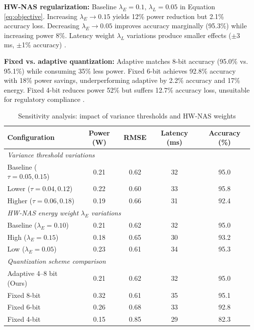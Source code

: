 \documentclass[12pt,a4paper]{article}
\begin{document}
\textbf{HW-NAS regularization:} Baseline $\lambda_E=0.1$, $\lambda_L=0.05$ in Equation \ref{eq:objective}. Increasing $\lambda_E \to 0.15$ yields 12\% power reduction but 2.1\% accuracy loss. Decreasing $\lambda_E \to 0.05$ improves accuracy marginally (95.3\%) while increasing power 8\%. Latency weight $\lambda_L$ variations produce smaller effects ($\pm$3 ms, $\pm$1\% accuracy) \citep{chitty2022hwnas, singh2024smart}.

\textbf{Fixed vs. adaptive quantization:} Adaptive matches 8-bit accuracy (95.0\% vs. 95.1\%) while consuming 35\% less power. Fixed 6-bit achieves 92.8\% accuracy with 18\% power savings, underperforming adaptive by 2.2\% accuracy and 17\% energy. Fixed 4-bit reduces power 52\% but suffers 12.7\% accuracy loss, unsuitable for regulatory compliance \citep{rakka2024mixedapprox, liu2025lowbit}.

\begin{table}[ht]
\centering
\caption{Sensitivity analysis: impact of variance thresholds and HW-NAS weights}
\label{tab:sensitivity}
\small
\begin{tabular}{lcccc}
\toprule
\textbf{Configuration} & \textbf{Power (W)} & \textbf{RMSE} & \textbf{Latency (ms)} & \textbf{Accuracy (\%)} \\
\midrule
\multicolumn{5}{l}{\textit{Variance threshold variations}} \\
Baseline ($\tau=0.05, 0.15$) & 0.21 & 0.62 & 32 & 95.0 \\
Lower ($\tau=0.04, 0.12$) & 0.22 & 0.60 & 33 & 95.8 \\
Higher ($\tau=0.06, 0.18$) & 0.19 & 0.66 & 31 & 92.4 \\
\midrule
\multicolumn{5}{l}{\textit{HW-NAS energy weight $\lambda_E$ variations}} \\
Baseline ($\lambda_E=0.10$) & 0.21 & 0.62 & 32 & 95.0 \\
High ($\lambda_E=0.15$) & 0.18 & 0.65 & 30 & 93.2 \\
Low ($\lambda_E=0.05$) & 0.23 & 0.61 & 34 & 95.3 \\
\midrule
\multicolumn{5}{l}{\textit{Quantization scheme comparison}} \\
Adaptive 4--8 bit (Ours) & 0.21 & 0.62 & 32 & 95.0 \\
Fixed 8-bit & 0.32 & 0.61 & 35 & 95.1 \\
Fixed 6-bit & 0.26 & 0.68 & 33 & 92.8 \\
Fixed 4-bit & 0.15 & 0.85 & 29 & 82.3 \\
\bottomrule
\end{tabular}
\end{table}
\end{document}
